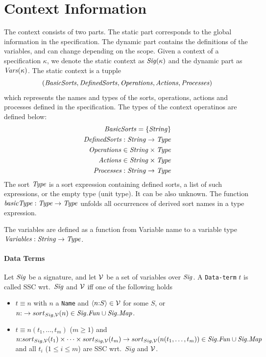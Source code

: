 \documentclass[fleqn,a4paper]{article}
\newcommand{\Sig}{\nm{Sig}}
\newcommand{\Fun}{\nm{Fun}}
\newcommand{\NV}{{\cal V}}
\newcommand{\Type}{\nm{Type}}
\newcommand{\String}{\nm{String}}
\begin{document}
\section{Context Information}
The context consists of two parts. The static part corresponds to the
global information in the specification. The dynamic part contains the
definitions of the variables, and can change depending on the scope.
Given a context of a specification $\kappa$, we denote the static context as
$\mathit{Sig(\kappa)}$ and the dynamic part as $\mathit{Vars}(\kappa)$.
The static context is a tupple
\[(\mathit{BasicSorts},\mathit{DefinedSorts},\mathit{Operations},\mathit{Actions},\mathit{Processes})\]
which represents the names and types of the sorts, operations, actions and processes
defined in the specification.
The types of the context operatinos are defined below:
\begin{align*}
\nm{BasicSorts}=\set{\String}\\
\func{\nm{DefinedSorts}}{\String}{\Type}\\
\nm{Operations}\in\String\x\Type\\
\nm{Actions}\in\String\x\Type\\
\func{\nm{Processes}}{\String}{\Type}
\end{align*}
The sort $\Type$ is a sort expression containing defined sorts, a list
of such expressions, or the empty type (unit type).  It can be also
unknown.  The function $\func{\nm{basicType}}{\Type}{\Type}$ unfolds
all occurrences of derived sort names in a type expression.

The variables are defined as a function from Variable name to a variable type
$\func{\nm{Variables}}{\String}{\Type}$.

\paragraph{Data Terms}
Let $\Sig$ be a signature, and let $\NV$ be a set of variables over
$\Sig$.
A {\tt Data-term} $t$ is called SSC wrt.\ $\Sig$ and $\NV$ iff one of
the following holds
\begin{itemize}
\item
  $t\equiv n$ with $n$ a {\tt Name} and
  $\langle n\ap S\rangle\in \NV$ for some $S$, or
  $n\ap  \rightarrow sort_{Sig,\NV}(n)\in \Sig.\Fun\cup\Sig.\Map$.
\item
  $t\equiv n(t_1,\ldots,t_m)$ ($m\geq 1$) and
  $n\ap sort_{Sig,\NV}(t_1)\times\cdots\times sort_{Sig,\NV}(t_m)
  \rightarrow sort_{Sig,\NV}(n(t_1,\ldots,t_m))\in \Sig.\Fun\cup\Sig.\Map$ and
  all
  $t_i$ ($1\leq i\leq m$) are SSC wrt.\ $Sig$ and $\NV$.
\end{itemize}
\end{document}
